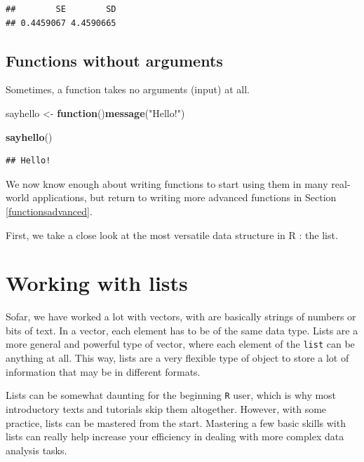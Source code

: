 \documentclass[]{book}
\newenvironment{Shaded}{\begin{snugshade}}{\end{snugshade}}
\newcommand{\ControlFlowTok}[1]{\textcolor[rgb]{0.13,0.29,0.53}{\textbf{#1}}}
\newcommand{\KeywordTok}[1]{\textcolor[rgb]{0.13,0.29,0.53}{\textbf{#1}}}
\newcommand{\NormalTok}[1]{#1}
\newcommand{\StringTok}[1]{\textcolor[rgb]{0.31,0.60,0.02}{#1}}
\begin{document}
\begin{verbatim}
##        SE        SD 
## 0.4459067 4.4590665
\end{verbatim}

\hypertarget{functions-without-arguments}{%
\subsection{Functions without arguments}\label{functions-without-arguments}}

Sometimes, a function takes no arguments (input) at all.

\begin{Shaded}
\begin{Highlighting}[]
\NormalTok{sayhello <-}\StringTok{ }\ControlFlowTok{function}\NormalTok{()}\KeywordTok{message}\NormalTok{(}\StringTok{"Hello!"}\NormalTok{)}

\KeywordTok{sayhello}\NormalTok{()}
\end{Highlighting}
\end{Shaded}

\begin{verbatim}
## Hello!
\end{verbatim}

We now know enough about writing functions to start using them in many real-world applications, but return to writing more advanced functions in Section \ref{functionsadvanced}.

First, we take a close look at the most versatile data structure in R : the list.

\hypertarget{workinglists}{%
\section{Working with lists}\label{workinglists}}

Sofar, we have worked a lot with vectors, with are basically strings of numbers or bits of text. In a vector, each element has to be of the same data type. Lists are a more general and powerful type of vector, where each element of the \texttt{list} can be anything at all. This way, lists are a very flexible type of object to store a lot of information that may be in different formats.

Lists can be somewhat daunting for the beginning \texttt{R} user, which is why most introductory texts and tutorials skip them altogether. However, with some practice, lists can be mastered from the start. Mastering a few basic skills with lists can really help increase your efficiency in dealing with more complex data analysis tasks.
\end{document}
